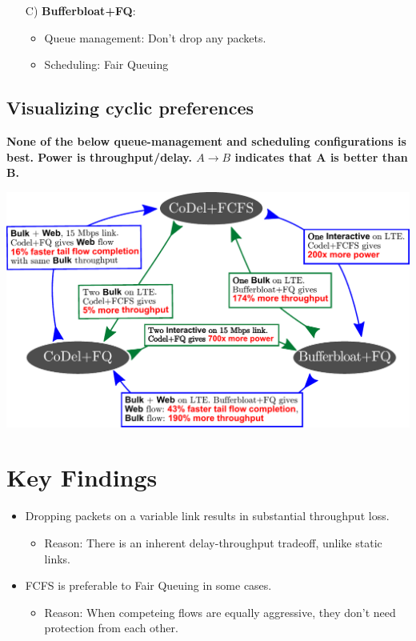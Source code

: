 {\begin{multicols}{2}
\begin{enumerate}
\item[C)] {\bf Bufferbloat+FQ}:
  \begin{itemize}
  \item Queue management: Don't drop any packets.
  \item Scheduling: Fair Queuing
  \end{itemize}

\end{enumerate}

\subsection*{Visualizing cyclic preferences}
\textbf{None of the below queue-management and scheduling configurations is best. Power is throughput/delay. $A\to B$ indicates that A is better than B.} \\
\begin{center}
\includegraphics[width=\columnwidth]{fig.pdf}
\end{center}

\section*{Key Findings}
\begin{itemize}
\item Dropping packets on a variable link results in substantial throughput loss.
      \begin{itemize}
      \item Reason: There is an inherent delay-throughput tradeoff, unlike static links.
      \end{itemize} 
 
\item FCFS is preferable to Fair Queuing in some cases.
      \begin{itemize}
      \item Reason: When competeing flows are equally aggressive, they don't need protection from each other.
      \end{itemize}


\end{itemize}
\end{multicols}}
